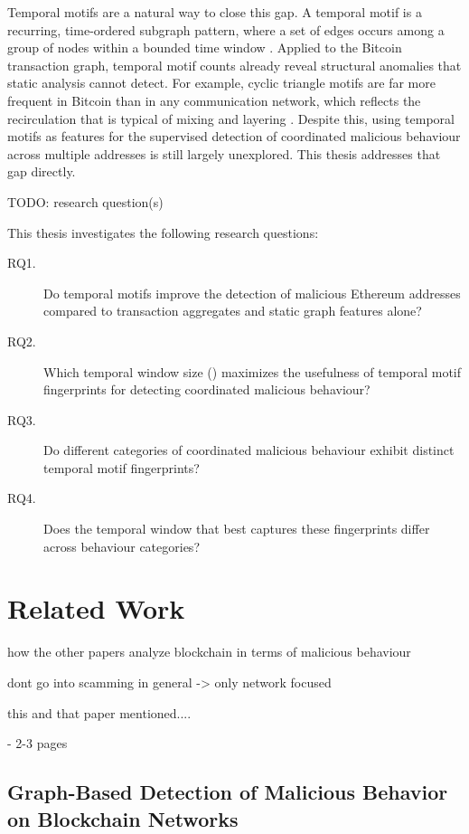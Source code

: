 \documentclass{thesisclass}
\begin{document}
Temporal motifs are a natural way to close this gap. A temporal motif is a recurring, time-ordered subgraph pattern, where a set of edges occurs among a group of nodes within a bounded time window \citep{kovanen2011temporal, paranjape2017motifs}. Applied to the Bitcoin transaction graph, temporal motif counts already reveal structural anomalies that static analysis cannot detect. For example, cyclic triangle motifs are far more frequent in Bitcoin than in any communication network, which reflects the recirculation that is typical of mixing and layering \citep{paranjape2017motifs}. Despite this, using temporal motifs as features for the supervised detection of coordinated malicious behaviour across multiple addresses is still largely unexplored. This thesis addresses that gap directly.

TODO: research question(s)

This thesis investigates the following research questions:

\begin{description}
\item[RQ1.] Do temporal motifs improve the detection of malicious Ethereum addresses compared to transaction aggregates and static graph features alone?
\item[RQ2.] Which temporal window size (\delta) maximizes the usefulness of temporal motif fingerprints for detecting coordinated malicious behaviour?
\item[RQ3.] Do different categories of coordinated malicious behaviour exhibit distinct temporal motif fingerprints?
\item[RQ4.] Does the temporal window that best captures these fingerprints differ across behaviour categories?
\end{description}

\chapter{Related Work} 

how the other papers analyze blockchain in terms of malicious behaviour

dont go into scamming in general -> only network focused

this and that paper mentioned....

- 2-3 pages

\section{Graph-Based Detection of Malicious Behavior on Blockchain Networks}
\end{document}
